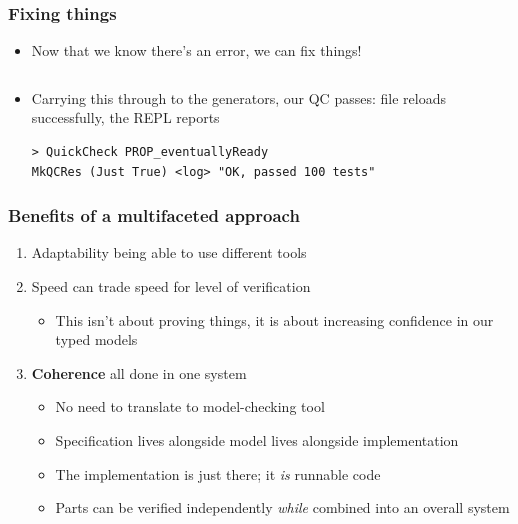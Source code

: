\documentclass[compress,handout]{beamer}
\begin{document}
\begin{frame}[fragile]
  \frametitle{Fixing things}

  \begin{itemize}
    \item<1-> Now that we know there's an error, we can fix things!
              \inputminted[fontsize=\scriptsize]{Idris}{qc-things/ATM-fixed-chkpin.idr}

    \item<2-> Carrying this through to the generators, our QC passes: file reloads
              successfully, the REPL reports
              \begin{verbatim}
> QuickCheck PROP_eventuallyReady
MkQCRes (Just True) <log> "OK, passed 100 tests"
              \end{verbatim}
  \end{itemize}

  \vspace*{-3mm}

\end{frame}


\begin{frame}
  \frametitle{Benefits of a multifaceted approach}

  \begin{enumerate}
    \item<1-> Adaptability {\textemdash} being able to use different tools
    \item<2-> Speed {\textemdash} can trade speed for level of verification
    \begin{itemize}
      \item<2-> This isn't about proving things, it is about increasing
                confidence in our typed models
    \end{itemize}
    \item<3-> \textbf{Coherence} {\textemdash} all done in one system
      \begin{itemize}
        \item<4-> No need to translate to model-checking tool
        \item<5-> Specification lives alongside model lives alongside
                  implementation
        \item<6-> The implementation is just there; it \emph{is} runnable code
        \item<7-> Parts can be verified independently \emph{while} combined into an
                  overall system
      \end{itemize}
  \end{enumerate}

\end{frame}
\end{document}

